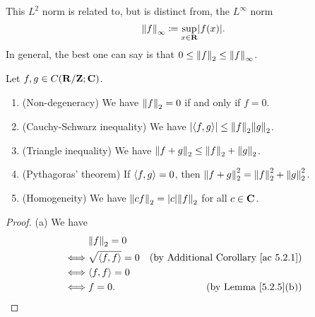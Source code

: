 \begin{note}
    This \(L^2\) norm is related to, but is distinct from, the \(L^\infty\) norm
    \[
        \norm*{f}_\infty \coloneqq \sup_{x \in \R} \abs{f(x)}.
    \]
    In general, the best one can say is that \(0 \leq \norm*{f}_2 \leq \norm*{f}_\infty\).
\end{note}

\setcounter{theorem}{6}
\begin{lemma}\label{5.2.7}
    Let \(f, g \in C(\R / \Z ; \C)\).
    \begin{enumerate}
        \item (Non-degeneracy)
              We have \(\norm*{f}_2 = 0\) if and only if \(f = 0\).
        \item (Cauchy-Schwarz inequality)
              We have \(\abs{\inner*{f, g}} \leq \norm*{f}_2 \norm*{g}_2\).
        \item (Triangle inequality)
              We have \(\norm*{f + g}_2 \leq \norm*{f}_2 + \norm*{g}_2\).
        \item (Pythagoras' theorem)
              If \(\inner*{f, g} = 0\), then \(\norm*{f + g}_2^2 = \norm*{f}_2^2 + \norm*{g}_2^2\).
        \item (Homogeneity)
              We have \(\norm*{cf}_2 = \abs{c} \norm*{f}_2\) for all \(c \in \C\).
    \end{enumerate}
\end{lemma}

\begin{proof}{(a)}
    We have
    \begin{align*}
             & \norm*{f}_2 = 0                                                            \\
        \iff & \sqrt{\inner*{f, f}} = 0 & \text{(by Additional Corollary \ref{ac 5.2.1})} \\
        \iff & \inner*{f, f} = 0                                                          \\
        \iff & f = 0.                   & \text{(by Lemma \ref{5.2.5}(b))}
    \end{align*}
\end{proof}

